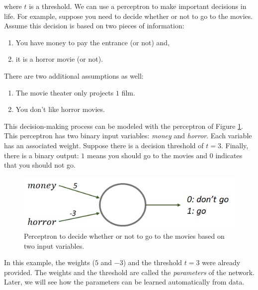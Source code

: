 \documentclass[
  11pt,
]{krantz}
\makeatletter
\providecommand{\tightlist}{%
  \setlength{\itemsep}{0pt}\setlength{\parskip}{0pt}}
\newenvironment{kframe}{%
\medskip{}
\setlength{\fboxsep}{.8em}
 \def\at@end@of@kframe{}%
 \ifinner\ifhmode%
  \def\at@end@of@kframe{\end{minipage}}%
  \begin{minipage}{\columnwidth}%
 \fi\fi%
 \def\FrameCommand##1{\hskip\@totalleftmargin \hskip-\fboxsep
 \colorbox{shadecolor}{##1}\hskip-\fboxsep
     \hskip-\linewidth \hskip-\@totalleftmargin \hskip\columnwidth}%
 \MakeFramed {\advance\hsize-\width
   \@totalleftmargin\z@ \linewidth\hsize
   \@setminipage}}%
 {\par\unskip\endMakeFramed%
 \at@end@of@kframe}
\newenvironment{rmdblock}[1]
  {
  \begin{itemize}
  \renewcommand{\labelitemi}{
    \raisebox{-.7\height}[0pt][0pt]{
      {\setkeys{Gin}{width=3em,keepaspectratio}\texttt{[image: images/icons/\#1]}}
    }
  }
  \setlength{\fboxsep}{1em}
  \begin{kframe}
  \item
  }
  {
  \end{kframe}
  \end{itemize}
  }
\newenvironment{rmdinfo}
  {\begin{rmdblock}{info}}
  {\end{rmdblock}}
\makeatother
\begin{document}
where \(t\) is a threshold. We can use a perceptron to make important decisions in life. For example, suppose you need to decide whether or not to go to the movies. Assume this decision is based on two pieces of information:

\begin{enumerate}
\def\labelenumi{\arabic{enumi}.}
\tightlist
\item
  You have money to pay the entrance (or not) and,
\item
  it is a horror movie (or not).
\end{enumerate}

There are two additional assumptions as well:

\begin{enumerate}
\def\labelenumi{\arabic{enumi}.}
\tightlist
\item
  The movie theater only projects \(1\) film.
\item
  You don't like horror movies.
\end{enumerate}

This decision-making process can be modeled with the perceptron of Figure \ref{fig:nnMovies}. This perceptron has two binary input variables: \emph{money} and \emph{horror}. Each variable has an associated weight. Suppose there is a decision threshold of \(t=3\). Finally, there is a binary output: \(1\) means you should go to the movies and \(0\) indicates that you should not go.

\begin{figure}

{\centering \includegraphics[width=0.5\linewidth]{images/nn_movies} 

}

\caption{Perceptron to decide whether or not to go to the movies based on two input variables.}\label{fig:nnMovies}
\end{figure}

\begin{rmdinfo}
In this example, the weights (\(5\) and \(-3\)) and the threshold \(t=3\) were already provided. The weights and the threshold are called the \emph{parameters} of the network. Later, we will see how the parameters can be learned automatically from data.
\end{rmdinfo}
\end{document}
